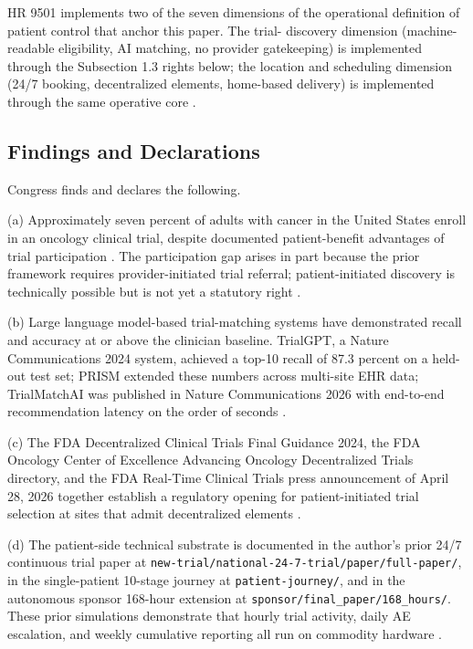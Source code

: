 HR 9501 implements two of the seven dimensions of the operational
definition of patient control that anchor this paper. The trial-
discovery dimension (machine-readable eligibility, AI matching, no
provider gatekeeping) is implemented through the Subsection 1.3 rights
below; the location and scheduling dimension (24/7 booking,
decentralized elements, home-based delivery) is implemented through
the same operative core \cite{jin2024trialgpt, gupta2024prism,
abdallah2026trialmatchai, fda_dct_guidance_2024,
fda_oce_advancing_oncology_dct_2024, dronca2026cancer_care_beyond_walls,
kawchak_2026_19994945}.

\subsection{Findings and Declarations}

Congress finds and declares the following.

(a) Approximately seven percent of adults with cancer in the United
States enroll in an oncology clinical trial, despite documented
patient-benefit advantages of trial participation
\cite{kawchak_2026_19994945}. The participation gap arises in part
because the prior framework requires provider-initiated trial referral;
patient-initiated discovery is technically possible but is not yet a
statutory right \cite{rank2_clinical_treatment_act_2020,
rank3_aca_clinical_trials_2010}.

(b) Large language model-based trial-matching systems have demonstrated
recall and accuracy at or above the clinician baseline. TrialGPT, a
Nature Communications 2024 system, achieved a top-10 recall of 87.3
percent on a held-out test set; PRISM extended these numbers across
multi-site EHR data; TrialMatchAI was published in Nature
Communications 2026 with end-to-end recommendation latency on the
order of seconds \cite{jin2024trialgpt, gupta2024prism,
abdallah2026trialmatchai}.

(c) The FDA Decentralized Clinical Trials Final Guidance 2024, the
FDA Oncology Center of Excellence Advancing Oncology Decentralized
Trials directory, and the FDA Real-Time Clinical Trials press
announcement of April 28, 2026 together establish a regulatory
opening for patient-initiated trial selection at sites that admit
decentralized elements \cite{fda_dct_guidance_2024,
fda_oce_advancing_oncology_dct_2024, fda_rtct_press_2026}.

(d) The patient-side technical substrate is documented in the
author's prior 24/7 continuous trial paper at
\texttt{new-trial/national-24-7-trial/paper/full-paper/}, in the
single-patient 10-stage journey at \texttt{patient-journey/}, and in
the autonomous sponsor 168-hour extension at
\texttt{sponsor/final\_paper/168\_hours/}. These prior simulations
demonstrate that hourly trial activity, daily AE escalation, and
weekly cumulative reporting all run on commodity hardware
\cite{kawchak_2026_19994945, kawchak_2026_19119939,
kawchak_2026_19396256}.

